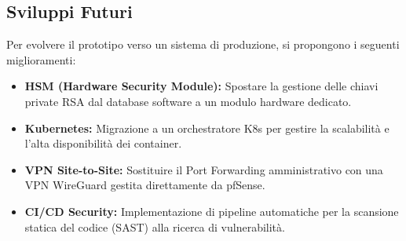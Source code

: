 \documentclass[a4paper, 12pt, titlepage]{article}
\begin{document}
\subsection{Sviluppi Futuri}
Per evolvere il prototipo verso un sistema di produzione, si propongono i seguenti miglioramenti:
\begin{itemize}
    \item \textbf{HSM (Hardware Security Module):} Spostare la gestione delle chiavi private RSA dal database software a un modulo hardware dedicato.
    \item \textbf{Kubernetes:} Migrazione a un orchestratore K8s per gestire la scalabilità e l'alta disponibilità dei container.
    \item \textbf{VPN Site-to-Site:} Sostituire il Port Forwarding amministrativo con una VPN WireGuard gestita direttamente da pfSense.
    \item \textbf{CI/CD Security:} Implementazione di pipeline automatiche per la scansione statica del codice (SAST) alla ricerca di vulnerabilità.
\end{itemize}
\end{document}
